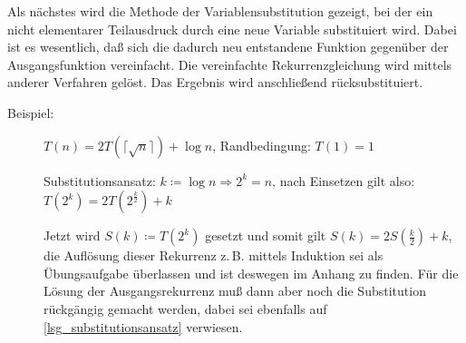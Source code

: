 \documentclass[ngerman,draft,parskip=half*,twoside]{scrreprt}
\theoremstyle{break}
\theoremstyle{nonumberbreak}
\begin{document}
Als nächstes wird die Methode der Variablensubstitution gezeigt,
bei der ein nicht elementarer Teilausdruck durch eine neue Variable substituiert wird. Dabei ist es wesentlich, daß
sich die dadurch neu entstandene Funktion gegenüber der Ausgangsfunktion vereinfacht. Die vereinfachte Rekurrenzgleichung wird
mittels anderer Verfahren gelöst. Das Ergebnis wird anschließend rücksubstituiert.
	\begin{description}
		\item [Beispiel:] $T(n) = 2 T(\lceil\sqrt{n}\rceil) + \log n$, Randbedingung: $T(1)=1$

		Substitutionsansatz: $k\coloneqq\log n \Rightarrow 2^k=n$, nach Einsetzen gilt also: $T(2^k) = 2 T(2^{\frac{k}{2}})+k$
		
		Jetzt wird $S(k) \coloneqq T(2^k)$ gesetzt und somit gilt $S(k) = 2 S\left(\frac{k}{2}\right)+k$, die Auflösung dieser
		Rekurrenz z.\,B. mittels Induktion sei als Übungsaufgabe überlassen und ist deswegen im Anhang zu finden. 
		Für die Lösung der Ausgangsrekurrenz muß dann aber noch die Substitution rückgängig gemacht werden, dabei sei
		ebenfalls auf \autoref{lsg_substitutionsansatz} verwiesen. 
	\end{description}	
\end{document}

